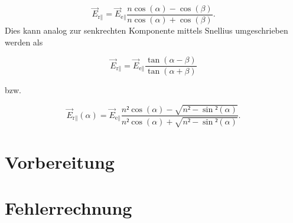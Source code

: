 \begin{equation*}
    \vec{E}_{\text{r}\parallel} = \vec{E}_{\text{e}\parallel}\frac{n\cos(\alpha)-\cos(\beta)}{n\cos(\alpha)+\cos(\beta)}.
\end{equation*}
 \noindent Dies kann analog zur senkrechten Komponente mittels Snellius umgeschrieben werden als 

 \begin{equation*}
    \vec{E}_{\text{r}\parallel} = \vec{E}_{\text{e}\parallel}\frac{\tan(\alpha-\beta)}{\tan(\alpha+\beta)}
 \end{equation*}

 \noindent bzw.

\begin{equation}
    \vec{E}_{\text{r}\parallel}(\alpha) = \vec{E}_{\text{e}\parallel}\frac{n²\cos(\alpha)-\sqrt{n²-\sin²(\alpha)}}{n²\cos(\alpha)+\sqrt{n²-\sin²(\alpha)}}.
\label{eqn:21}
\end{equation}




\section{Vorbereitung}

\section{Fehlerrechnung}
